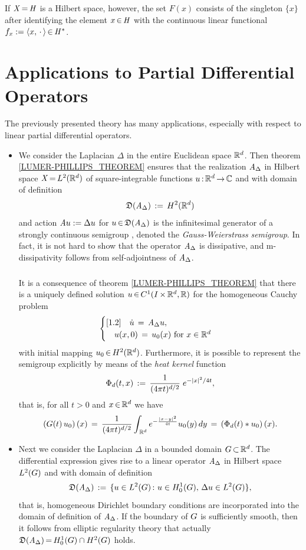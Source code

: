 \documentclass[11pt,twoside]{article}
\begin{document}
\subparagraph{}
If $\mathit{X} {\,=\,} \mathit{H}$ is a Hilbert space,
however,
the set $F(x)$ consists of the singleton $\{x\}$
after identifying the element $x {\,\in\,} \mathit{H}$
with the continuous linear functional
$f_x := \langle x,\,\cdot\, \rangle {\,\in\,} \mathit{H}^*$.

\section{Applications to Partial Differential Operators}
The previously presented theory has many applications,
especially with respect to linear partial differential operators.

\begin{itemize}[leftmargin=12pt,itemsep=5pt]
\item[1.]
We consider the Laplacian $\Delta$ in the entire Euclidean space ${\mathbb{R}}^d$.
Then theorem \ref{LUMER-PHILLIPS_THEOREM} ensures
that the realization $\mathit{A}_{\Delta}$ in Hilbert space $\mathit{X} {\,=\,} L^2({\mathbb{R}}^d)$
of square-integrable functions $u {\,:\,} {\mathbb{R}}^d {\,\to\,} {\mathbb{C}}$
and with domain of definition
\[
\mathfrak{D}(\mathit{A}_{\Delta}) \,:=\, H^2({\mathbb{R}}^d)
\]
and action $\mathit{A} u := \Delta u$ for $u {\,\in\,} \mathfrak{D}(\mathit{A}_{\Delta})$
is the infinitesimal generator
of a strongly continuous semigroup {\GG},
denoted the \textit{Gauss-Weierstrass} \textit{semigroup}.
In fact,
it is not hard to show that the operator $\mathit{A}_{\Delta}$ is dissipative,
and m-dissipativity follows from self-adjointness of $\mathit{A}_{\Delta}$.

\subparagraph{} %
It is a consequence of theorem \ref{LUMER-PHILLIPS_THEOREM}
that there is a uniquely defined solution $u {\,\in\,} C^1(I {\,\times\,} {\mathbb{R}}^d,{\mathbb{R}})$
for the homogeneous Cauchy problem
\[
\begin{cases}[1.2]
\quad \dot{u} \,=\, \mathit{A}_{\Delta} u,\\
\quad u(x,0) \,=\, u_0(x) \mbox{ for } x \in {\mathbb{R}}^d\\
\end{cases}
\]
with initial mapping $u_0 {\,\in\,} H^2({\mathbb{R}}^d)$.
Furthermore,
it is possible to represent the semigroup {\GG}
explicitly by means of the \textit{heat kernel} function
\[
\Phi_d(t,x) \eqdef \frac{1}{(4 \pi t)^{d/2}} \; e^{- \abs{x} ^2/4t},
\]
that is,
for all $t > 0$ and $x {\,\in\,} {\mathbb{R}}^d$ we have
\[
(G(t) \, u_0) \, (x)
\=
\frac{1}{(4 \pi t)^{d/2}}
\int_{\,\Rd} e^{- \frac{\abs{x-y} ^2}{4t}} u_0(y) \, dy
\=
(\Phi_d(t) \ast u_0)\,(x).
\]

\item[2.]
Next we consider the Laplacian $\Delta$ in a bounded domain $G {\,\subset\,} {\mathbb{R}}^d$.
The differential expression gives rise to a linear operator $\mathit{A}_{\Delta}$
in Hilbert space $L^2(G)$ and with domain of definition
\[
\mathfrak{D}(\mathit{A}_{\Delta}) \,:=\,
\{u \in L^2(G){\,:\,} \,u \in H_0^{1}(G), \, \Delta u \in L^2(G)\},
\]
that is, homogeneous Dirichlet boundary conditions are incorporated into
the domain of definition of $\mathit{A}_{\Delta}$. 
If the boundary of $G$ is sufficiently smooth,
then it follows from elliptic regularity theory that actually
$\mathfrak{D}(\mathit{A}_{\Delta}) {\,=\,} H_0^{1}(G) \cap H^2(G)$ holds.


\end{itemize}
\end{document}
